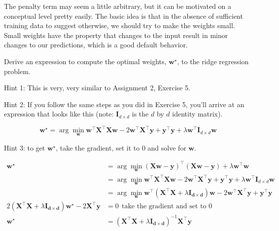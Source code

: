 \documentclass[assignment03_Solutions]{subfiles}
\begin{document}
The penalty term may seem a little arbitrary, but it can be motivated on a conceptual level pretty easily.  The basic idea is that in the absence of sufficient training data to suggest otherwise, we should try to make the weights small.  Small weights have the property that changes to the input result in minor changes to our predictions, which is a good default behavior.

\vspace{1em}
\begin{exercise}[(60 minutes)]
Derive an expression to compute the optimal weights, $\mathbf{w^\star}$, to the ridge regression problem.

Hint 1: This is very, very similar to Assignment 2, Exercise 5. 

Hint 2: If you follow the same steps as you did in Exercise 5, you'll arrive at an expression that looks like this (note: $\mathbf{I}_{d \times d}$ is the $d$ by $d$ identity matrix).

$$\mathbf{w^\star} = \arg\min_\mathbf{w} \mathbf{w}^\top \mathbf{X}^\top \mathbf{X} \mathbf{w} - 2\mathbf{w}^\top \mathbf{X}^\top \mathbf{y} + \mathbf{y}^\top \mathbf{y} + \lambda \mathbf{w}^\top  \mathbf{I}_{d \times d} \mathbf{w}$$

Hint 3: to get $\mathbf{w^\star}$, take the gradient, set it to 0 and solve for $\mathbf{w}$.

\begin{boxedsolution}


\begin{align}
\mathbf{w^\star} &= \arg\min_\mathbf{w} \left ( \mathbf{X}\mathbf{w} - \mathbf{y} \right)^\top \left ( \mathbf{X}\mathbf{w} -  \mathbf{y} \right) + \lambda \mathbf{w}^\top \mathbf{w} \\
& = \arg\min_\mathbf{w} \mathbf{w}^\top \mathbf{X}^\top \mathbf{X} \mathbf{w} - 2\mathbf{w}^\top \mathbf{X}^\top \mathbf{y} + \mathbf{y}^\top \mathbf{y} + \lambda \mathbf{w}^\top  \mathbf{I}_{d \times d} \mathbf{w}\\
&= \arg\min_\mathbf{w} \mathbf{w}^\top \left ( \mathbf{X}^\top \mathbf{X} + \lambda \mathbf{I_{d \times d}} \right )\mathbf{w} - 2\mathbf{w}^\top \mathbf{X}^\top \mathbf{y} + \mathbf{y}^\top \mathbf{y} \\
2 \left (  \mathbf{X}^\top \mathbf{X} + \lambda \mathbf{I_{d \times d}} \right ) \mathbf{w^\star} - 2 \mathbf{X}^\top \mathbf{y} &=0 ~~\mbox{take the gradient and set to 0} \\
\mathbf{w}^\star &= \left ( \mathbf{X}^\top \mathbf{X} + \lambda \mathbf{I_{d \times d}} \right)^{-1} \mathbf{X}^\top \mathbf{y}
\end{align}

\end{boxedsolution}
\end{exercise}
\end{document}
